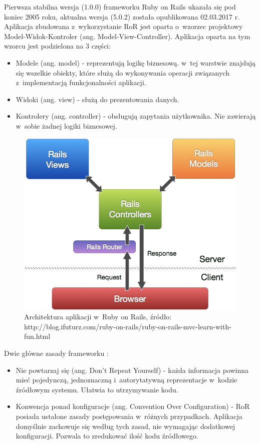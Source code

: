 \documentclass[archivemode]{mgr}
\begin{document}
Pierwsza stabilna wersja (1.0.0) frameworku Ruby on Rails ukazała się pod koniec 2005 roku, aktualna wersja (5.0.2) została opublikowana 02.03.2017 r. Aplikacja zbudowana z~wykorzystanie RoR jest oparta o~wzorzec projektowy Model-Widok-Kontroler \cite{rails_agile} (ang. Model-View-Controller). Aplikacja oparta na tym wzorcu jest podzielona na 3 części:
\begin{itemize}
  \item Modele (ang. model) - reprezentują logikę biznesową. w~tej warstwie znajdują się wszelkie obiekty, które służą do wykonywania operacji związanych z~implementacją funkcjonalności aplikacji.
  \item Widoki (ang. view) - służą do prezentowania danych. 
  \item Kontrolery (ang. controller) - obsługują zapytania użytkownika. Nie zawierają w~sobie żadnej logiki biznesowej.
\end{itemize}

\begin{figure}[H]
  \centering
  \includegraphics[width=0.5\linewidth]{pictures/rails_mvc}
  \caption{Architektura aplikacji w~Ruby on Rails, źródło: http://blog.ifuturz.com/ruby-on-rails/ruby-on-rails-mvc-learn-with-fun.html}
  \label{fig:rails_mvc}
\end{figure}
Dwie główne zasady frameworku \cite{doc_rails}:

\begin{itemize}
  \item Nie powtarzaj się (ang. Don't Repeat Yourself) - każda informacja powinna mieć pojedynczą, jednoznaczną i~autorytatywną reprezentacje w~kodzie źródłowym systemu. Ułatwia to utrzymywanie kodu.
  \item Konwencja ponad konfiguracje (ang. Convention Over Configuration) - RoR posiada ustalone zasady postępowania w~różnych przypadkach. Aplikacja domyślnie zachowuje się według tych zasad, nie wymagając dodatkowej konfiguracji. Pozwala to zredukować ilość kodu źródłowego.
\end{itemize}
\end{document}
